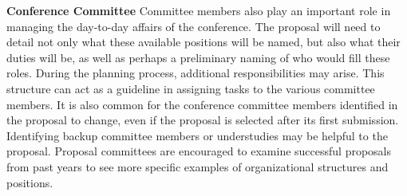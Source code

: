 \documentclass[12pt]{article}
\begin{document}
\textbf{Conference Committee} Committee members also play an important role in managing the day-to-day affairs of the conference. The proposal will need to detail not only what these available positions will be named, but also what their duties will be, as well as perhaps a preliminary naming of who would fill these roles. During the planning process, additional responsibilities may arise. This structure can act as a guideline in assigning tasks to the various committee members. It is also common for the conference committee members identified in the proposal to change, even if the proposal is selected after its first submission. Identifying backup committee members or understudies may be helpful to the proposal. Proposal committees are encouraged to examine successful proposals from past years to see more specific examples of organizational structures and positions.
\end{document}

